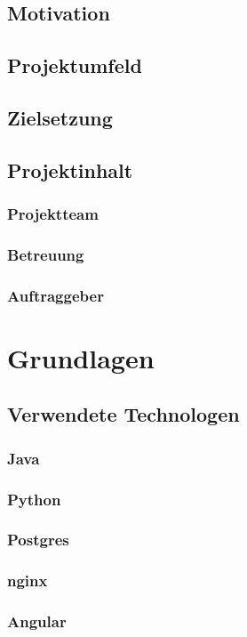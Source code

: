 \documentclass{report}
\begin{document}
\section{Motivation}
\section{Projektumfeld}
\section{Zielsetzung}
\section{Projektinhalt}
\subsection{Projektteam}
\subsection{Betreuung}
\subsection{Auftraggeber}

\chapter{Grundlagen}
\section{Verwendete Technologen}
\subsection{Java}
\subsection{Python}
\subsection{Postgres}
\subsection{nginx}
\subsection{Angular}
\end{document}
